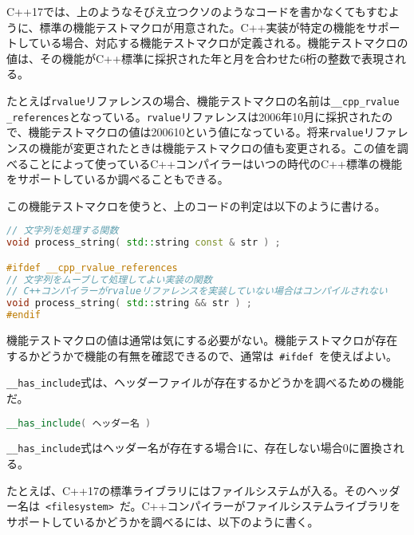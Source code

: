 C++17では、上のようなそびえ立つクソのようなコードを書かなくてもすむように、標準の機能テストマクロが用意された。C++実装が特定の機能をサポートしている場合、対応する機能テストマクロが定義される。機能テストマクロの値は、その機能がC++標準に採択された年と月を合わせた6桁の整数で表現される。

たとえば\lstinline!rvalue!リファレンスの場合、機能テストマクロの名前は\lstinline[breaklines=true]!__cpp_rvalue _references!となっている。\lstinline!rvalue!リファレンスは2006年10月に採択されたので、機能テストマクロの値は200610という値になっている。将来\lstinline!rvalue!リファレンスの機能が変更されたときは機能テストマクロの値も変更される。この値を調べることによって使っているC++コンパイラーはいつの時代のC++標準の機能をサポートしているか調べることもできる。

この機能テストマクロを使うと、上のコードの判定は以下のように書ける。

\begin{lstlisting}[language=C++]
// 文字列を処理する関数
void process_string( std::string const & str ) ;

#ifdef __cpp_rvalue_references
// 文字列をムーブして処理してよい実装の関数
// C++コンパイラーがrvalueリファレンスを実装していない場合はコンパイルされない
void process_string( std::string && str ) ;
#endif
\end{lstlisting}

機能テストマクロの値は通常は気にする必要がない。機能テストマクロが存在するかどうかで機能の有無を確認できるので、通常は~\lstinline!#ifdef!~を使えばよい。

%

\lstinline!__has_include!式は、ヘッダーファイルが存在するかどうかを調べるための機能だ。

\begin{lstlisting}[language=C++]
__has_include( ヘッダー名 )
\end{lstlisting}

\lstinline!__has_include!式はヘッダー名が存在する場合1に、存在しない場合0に置換される。

たとえば、C++17の標準ライブラリにはファイルシステムが入る。そのヘッダー名は~\lstinline!<filesystem>!~だ。C++コンパイラーがファイルシステムライブラリをサポートしているかどうかを調べるには、以下のように書く。

